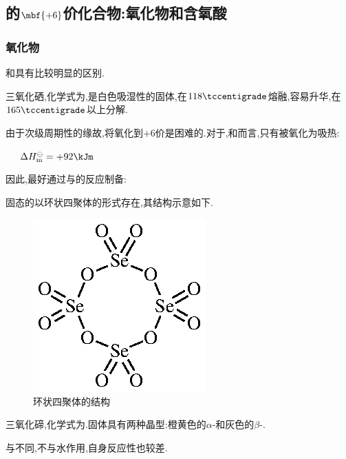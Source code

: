 \documentclass{ctexart}
\begin{document}
\subsection{的$\mbf{+6}$价化合物:氧化物和含氧酸}
\subsubsection{氧化物}
和具有比较明显的区别.
\begin{substance}[\ce{SeO3}]
    三氧化硒,化学式为,是白色吸湿性的固体,在$118\tccentigrade$熔融,容易升华,在$165\tccentigrade$以上分解.
\end{substance}
由于次级周期性的缘故,将氧化到$+6$价是困难的.对于,和而言,只有被氧化为吸热:
\begin{center}
    \ \ \ $\Delta H_\text{m}^\ominus=+92\kJm$
\end{center}
因此,最好通过与的反应制备:
\begin{center}
\end{center}
固态的以环状四聚体的形式存在,其结构示意如下.
\begin{figure}[H]
    \centering\includegraphics{picture/SeO3.eps}
    \caption{环状四聚体的结构}
\end{figure}
\begin{substance}[\ce{TeO3}]
    三氧化碲,化学式为.固体具有两种晶型:橙黄色的$\alpha$-和灰色的$\beta$-.
\end{substance}
与不同,不与水作用,自身反应性也较差.
\end{document}
